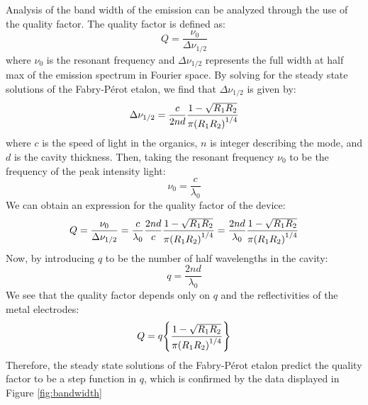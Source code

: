 \documentclass{report}
\begin{document}
            Analysis of the band width of the emission can be analyzed through the use of the quality factor. The quality factor is defined as:
            \begin{equation}
                Q=\frac{\nu_0}{\Delta\nu_{1/2}}
            \end{equation}
            where $\nu_0$ is the resonant frequency and $\Delta\nu_{1/2}$ represents the full width at half max of the emission spectrum in Fourier space\cite{joseph1995laser}. By solving for the steady state solutions of the Fabry-P\'erot etalon, we find that $\Delta\nu_{1/2}$ is given by:
            \begin{equation}
                \Delta\nu_{1/2}=\frac{c}{2nd}\frac{1-\sqrt{R_1R_2}}{\pi\qty(R_1R_2)^{1/4}}
            \end{equation}
            where $c$ is the speed of light in the organics, $n$ is integer describing the mode, and $d$ is the cavity thickness\cite{joseph1995laser}. Then, taking the resonant frequency $\nu_0$ to be the frequency of the peak intensity light:
            \begin{equation}
                \nu_0=\frac{c}{\lambda_0}
            \end{equation}
            We can obtain an expression for the quality factor of the device:
            \begin{equation}
                Q=\frac{\nu_0}{\Delta\nu_{1/2}}=\frac{c}{\lambda_0}\frac{2nd}{c}\frac{1-\sqrt{R_1R_2}}{\pi\qty(R_1R_2)^{1/4}}=\frac{2nd}{\lambda_0}\frac{1-\sqrt{R_1R_2}}{\pi\qty(R_1R_2)^{1/4}}
            \end{equation}
            Now, by introducing $q$ to be the number of half wavelengths in the cavity:
            \begin{equation}
                q=\frac{2nd}{\lambda_0}
            \end{equation}
            We see that the quality factor depends only on $q$ and the reflectivities of the metal electrodes:
            \begin{equation}
                Q=q\qty{\frac{1-\sqrt{R_1R_2}}{\pi\qty(R_1R_2)^{1/4}}}
            \end{equation}
            Therefore, the steady state solutions of the Fabry-P\'erot etalon predict the quality factor to be a step function in $q$, which is confirmed by the data displayed in Figure \ref{fig:bandwidth}
\end{document}

